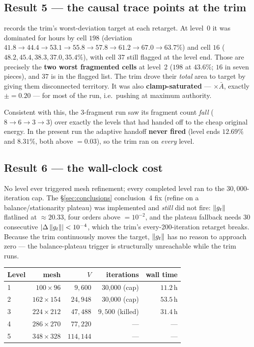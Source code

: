 \documentclass[11pt,a4paper]{article}
\begin{document}
\subsection{Result 5 --- the causal trace points at the trim}
 records the trim's worst-deviation target at each retarget.
At level~0 it was dominated for hours by cell \(198\) (deviation \(41.8 \to 44.4
\to 53.1 \to 55.8 \to 57.8 \to 61.2 \to 67.0 \to 63.7\%\)) and cell \(16\)
(\(48.2, 45.4, 38.3, 37.0, 35.4\%\)), with cell \(37\) still flagged at the level
end. Those are precisely the \textbf{two worst fragmented cells} at level~2
(\(198\) at \(43.6\%\); \(16\) in seven pieces), and \(37\) is in the flagged list.
The trim drove their \emph{total} area to target by giving them disconnected
territory. It was also \textbf{clamp-saturated} --- 
\(\times \bar A\), exactly \(\pm\)\(=0.20\) --- for most of
the run, i.e.\ pushing at maximum authority.

Consistent with this, the \(3\)-fragment run  saw its
fragment count \emph{fall} (\(8 \to 6 \to 3 \to 3\)) over exactly the levels that
had handed off to the cheap original energy. In the present run the adaptive
handoff \textbf{never fired} (level ends \(12.69\%\) and \(8.31\%\), both above
\(=0.03\)), so the trim ran on \emph{every} level.

\subsection{Result 6 --- the wall-clock cost}
No level ever triggered mesh refinement; every completed level ran to the
\(30{,}000\)-iteration cap. The \S\ref{sec:conclusions} conclusion~4 fix (refine on
a balance/stationarity plateau) was implemented and \emph{still} did not fire:
\(\left\|g_t\right\|\) flatlined at \(\approx 20.33\), four orders above
\(=10^{-2}\), and the plateau fallback needs \(30\)
consecutive \(\left|\Delta \left\|g_t\right\|\right| < 10^{-4}\), which the trim's every-200-iteration
retarget breaks. Because the trim continuously moves the target, \(\left\|g_t\right\|\) has
no reason to approach zero --- the balance-plateau trigger is structurally
unreachable while the trim runs.

\begin{center}\small
\begin{tabular}{@{}lrrrr@{}}
\toprule
Level & mesh & \(V\) & iterations & wall time \\
\midrule
1 & \(100\times96\)  & \(9{,}600\)  & 30{,}000 (cap) & \(11.2\)\,h \\
2 & \(162\times154\) & \(24{,}948\) & 30{,}000 (cap) & \(53.5\)\,h \\
3 & \(224\times212\) & \(47{,}488\) & \(9{,}500\) (killed) & \(31.4\)\,h \\
4 & \(286\times270\) & \(77{,}220\) & --- & --- \\
5 & \(348\times328\) & \(114{,}144\) & --- & --- \\
\bottomrule
\end{tabular}
\end{center}
\end{document}
